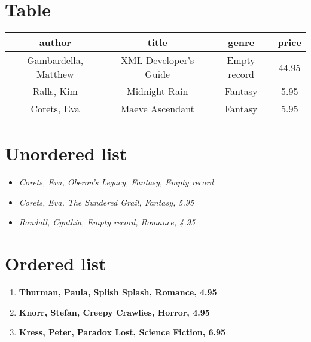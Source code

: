 \documentclass{article}
\begin{document}
\section{Table}
\begin{center}
\begin{tabular}{|c|c|c|c|}
\hline
author & title & genre & price \\ \hline \hline
Gambardella, Matthew & XML Developer's Guide & Empty record & 44.95 \\ \hline
Ralls, Kim & Midnight Rain & Fantasy & 5.95 \\ \hline
Corets, Eva & Maeve Ascendant & Fantasy & 5.95 \\ \hline
\end{tabular}
\end{center}
\section{Unordered list}
\begin{itemize}
\item \textit{Corets, Eva, Oberon's Legacy, Fantasy, Empty record}
\item \textit{Corets, Eva, The Sundered Grail, Fantasy, 5.95}
\item \textit{Randall, Cynthia, Empty record, Romance, 4.95}
\end{itemize}
\section{Ordered list}
\begin{enumerate}
\item \textbf{Thurman, Paula, Splish Splash, Romance, 4.95}
\item \textbf{Knorr, Stefan, Creepy Crawlies, Horror, 4.95}
\item \textbf{Kress, Peter, Paradox Lost, Science Fiction, 6.95}
\end{enumerate}
\end{document}
